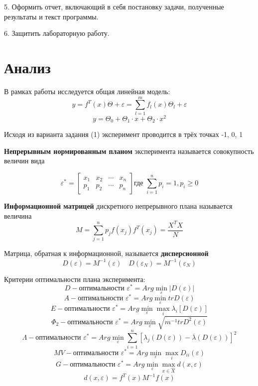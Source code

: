 5.	Оформить отчет, включающий в себя постановку задачи, полученные результаты и текст программы.

6.	Защитить лабораторную работу. 


\section{Анализ}

В рамках работы исследуется общая линейная модель:
\[ y = f^T(x)\Theta + \varepsilon = \sum_{l=1}^m f_l(x)\Theta_l + \varepsilon \]
\[ y = \Theta_0 + \Theta_1 \cdot x + \Theta_2 \cdot x^2 \]

Исходя из варианта задания (1) эксперимент проводится в трёх точках -1, 0, 1

{\bf Непрерывным нормированным планом} эксперимента называется совокупность величин вида

\[
	\varepsilon^*=
	\begin{bmatrix}
	    x_1		&	x_2		&	\cdots		&	x_n	\\
 	    p_1		&	p_2		&	\cdots		&	p_n
	\end{bmatrix}
	\text{где } \sum_{i=1}^n p_i = 1, p_i \geq 0
\] 

{\bf Информационной матрицей} дискретного непрерывного плана называется величина
\[M = \sum_{j=1}^n p_j f(x_j)f^T(x_j) = \frac{X^T X}{N}\]

Матрица, обратная к информационной, называется {\bf дисперсионной}
\[ D(\varepsilon)=M^{-1}(\varepsilon) \quad D(\varepsilon_N)=M^{-1}(\varepsilon_N) \]

Критерии оптимальности плана эксперимента:
\[ D-\text{оптимальности } \varepsilon^* = Arg \min_{\varepsilon} |D(\varepsilon)| \]
\[ A-\text{оптимальности } \varepsilon^* = Arg \min_{\varepsilon} tr D(\varepsilon) \]
\[ E-\text{оптимальности } \varepsilon^* = Arg \min_{\varepsilon} \max_i \lambda_i[D(\varepsilon)] \]
\[ \Phi_2-\text{оптимальности } \varepsilon^* = Arg \min_{\varepsilon} \sqrt{m^{-1} tr D^2(\varepsilon)} \]
\[ \Lambda-\text{оптимальности } \varepsilon^* = Arg \min_{\varepsilon} \sum_{i=1}^n [ \lambda_j(D(\varepsilon)) - \overline{\lambda}(D(\varepsilon)) ]^2 \]
\[ MV-\text{оптимальности } \varepsilon^* = Arg \min_{\varepsilon} \max_i D_{ii}(\varepsilon) \]
\[ G-\text{оптимальности } \varepsilon^* = Arg \min_{\varepsilon} \max_{x \in \hat{X}} d(x, \varepsilon) \]
\[ d(x, \varepsilon) = f^T(x) M^{-1} f(x) \]



